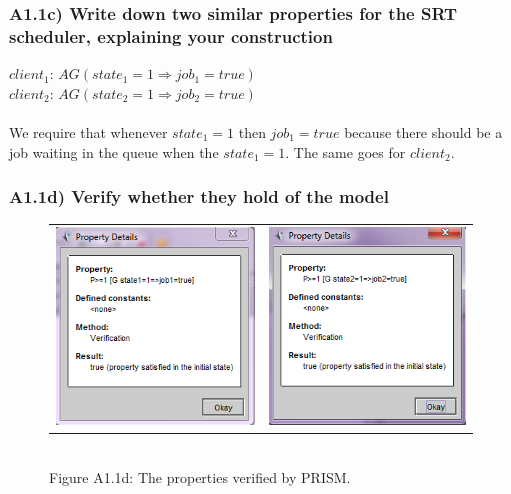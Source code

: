 \documentclass[12pt]{report}
\begin{document}
\subsubsection*{A1.1c) Write down two similar properties for the SRT scheduler, explaining your construction}
$client_1$: $AG (state_1 = 1 \Rightarrow job_1 = true)$\\
$client_2$: $AG (state_2 = 1 \Rightarrow job_2 = true)$\\
\\
We require that whenever $state_1 = 1$ then $job_1 = true$ because there should be a job waiting in the queue when the $state_1 = 1$. The same goes for $client_2$.

\subsubsection*{A1.1d) Verify whether they hold of the model}
\begin{figure}[H]
			\centering
			\begin{tabular}{ l r }
				\includegraphics[scale=0.75]{../GFX/A1-1d-client1.png}
				& \includegraphics[scale=0.75]{../GFX/A1-1d-client2.png}
			\end{tabular}\\
			Figure A1.1d: The properties verified by PRISM.
		\end{figure}
\end{document}
